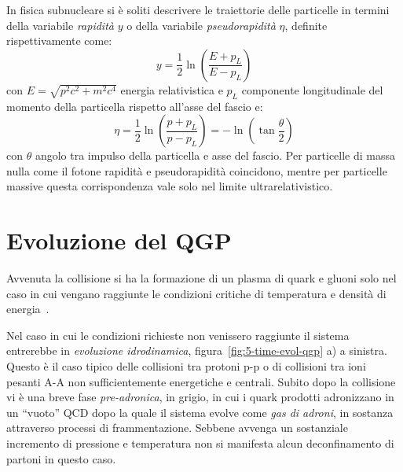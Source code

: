          In fisica subnucleare si è soliti descrivere le traiettorie delle particelle in termini della variabile \textit{rapidità} $y$ o della variabile \textit{pseudorapidità} $\eta$, definite rispettivamente come:
         \begin{equation*}
             y = \frac{1}{2} \ln(\frac{E + p_L}{E - p_L})
         \end{equation*}
        con $E = \sqrt{p^2 c^2 + m^2 c^4}$ energia relativistica e $p_L$ componente longitudinale del momento della particella rispetto all'asse del fascio e:
        \begin{equation*}
            \eta = \frac{1}{2} \ln(\frac{p + p_L}{p - p_L}) = - \ln(\tan{\frac{\theta}{2}})
        \end{equation*}
        con $\theta$ angolo tra impulso della particella e asse del fascio. Per particelle di massa nulla come il fotone rapidità e pseudorapidità coincidono, mentre per particelle massive questa corrispondenza vale solo nel limite ultrarelativistico.

\section{Evoluzione del QGP}
    Avvenuta la collisione si ha la formazione di un plasma di quark e gluoni solo nel caso in cui vengano raggiunte le condizioni critiche di temperatura e densità di energia~\cite{Andronic_2014}.
    
    Nel caso in cui le condizioni richieste non venissero raggiunte il sistema entrerebbe in \textit{evoluzione idrodinamica}, figura~\ref{fig:5-time-evol-qgp} a) a sinistra. Questo è il caso tipico delle collisioni tra protoni p-p o di collisioni tra ioni pesanti A-A non sufficientemente energetiche e centrali. Subito dopo la collisione vi è una breve fase \textit{pre-adronica}, in grigio, in cui i quark prodotti adronizzano in un ``vuoto'' QCD dopo la quale il sistema evolve come \textit{gas di adroni}, in sostanza attraverso processi di frammentazione. Sebbene avvenga un sostanziale incremento di pressione e temperatura non si manifesta alcun deconfinamento di partoni in questo caso.

